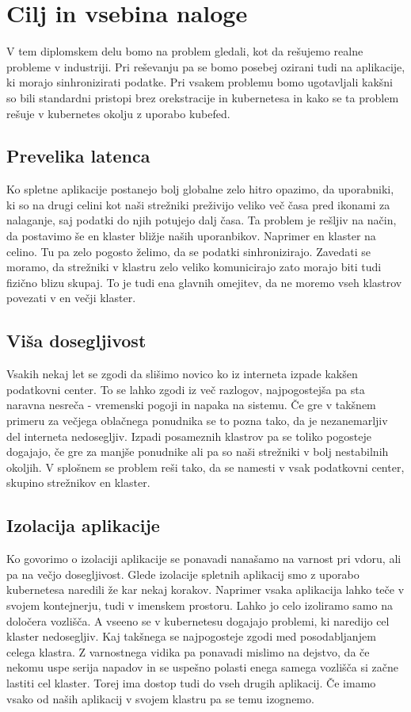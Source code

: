 \documentclass[a4paper, 12pt]{book}
\begin{document}
\section{Cilj in vsebina naloge}
V tem diplomskem delu bomo na problem gledali, kot da rešujemo realne probleme v industriji. 
Pri reševanju pa se bomo posebej ozirani tudi na aplikacije, ki morajo sinhronizirati podatke.
Pri vsakem problemu bomo ugotavljali kakšni so bili standardni pristopi brez orekstracije in kubernetesa in kako se ta problem rešuje v kubernetes okolju z uporabo kubefed.
\subsection{Prevelika latenca}
Ko spletne aplikacije postanejo bolj globalne zelo hitro opazimo, da uporabniki, ki so na drugi celini kot naši strežniki preživijo veliko več časa pred ikonami za nalaganje, saj podatki do njih potujejo dalj časa.
Ta problem je rešljiv na način, da postavimo še en klaster bližje naših uporanbikov.
Naprimer en klaster na celino. Tu pa zelo pogosto želimo, da se podatki sinhronizirajo.
Zavedati se moramo, da strežniki v klastru zelo veliko komunicirajo zato morajo biti tudi fizično blizu skupaj. 
To je tudi ena glavnih omejitev, da ne moremo vseh klastrov povezati v en večji klaster.
\subsection{Viša dosegljivost}
Vsakih nekaj let se zgodi da slišimo novico ko iz interneta izpade kakšen podatkovni center. 
To se lahko zgodi iz več razlogov, najpogostejša pa sta naravna nesreča - vremenski pogoji in napaka na sistemu.
Če gre v takšnem primeru za večjega oblačnega ponudnika se to pozna tako, da je nezanemarljiv del interneta nedosegljiv.
Izpadi posameznih klastrov pa se toliko pogosteje dogajajo, če gre za manjše ponudnike ali pa so naši strežniki v bolj nestabilnih okoljih. 
V splošnem se problem reši tako, da se namesti v vsak podatkovni center, skupino strežnikov en klaster.
\subsection{Izolacija aplikacije}
Ko govorimo o izolaciji aplikacije se ponavadi nanašamo na varnost pri vdoru, ali pa na večjo dosegljivost.
Glede izolacije spletnih aplikacij smo z uporabo kubernetesa naredili že kar nekaj korakov.
Naprimer vsaka aplikacija lahko teče v svojem kontejnerju, tudi v imenskem prostoru.
Lahko jo celo izoliramo samo na določera vozlišča.
A vseeno se v kubernetesu dogajajo problemi, ki naredijo cel klaster nedosegljiv.
Kaj takšnega se najpogosteje zgodi med posodabljanjem celega klastra.
Z varnostnega vidika pa ponavadi mislimo na dejstvo, da če nekomu uspe serija napadov in se uspešno polasti enega samega vozlišča si začne lastiti cel klaster.
Torej ima dostop tudi do vseh drugih aplikacij.
Če imamo vsako od naših aplikacij v svojem klastru pa se temu izognemo.
\end{document}
